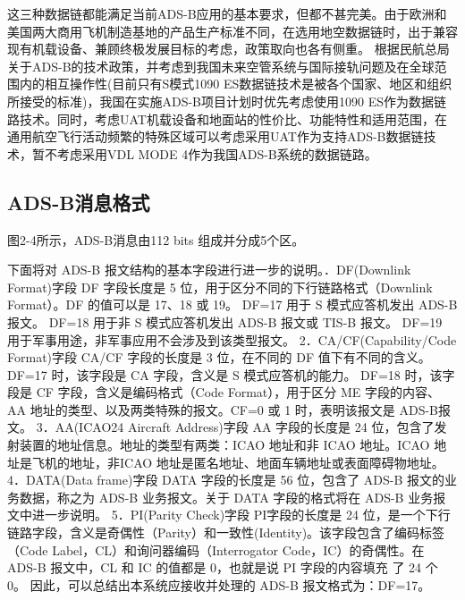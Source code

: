 
这三种数据链都能满足当前ADS-B应用的基本要求，但都不甚完美。由于欧洲和美国两大商用飞机制造基地的产品生产标准不同，在选用地空数据链时，出于兼容现有机载设备、兼顾终极发展目标的考虑，政策取向也各有侧重。 根据民航总局关于ADS-B的技术政策，并考虑到我国未来空管系统与国际接轨问题及在全球范围内的相互操作性(目前只有S模式1090  ES数据链技术是被各个国家、地区和组织所接受的标准)，我国在实施ADS-B项目计划时优先考虑使用1090 ES作为数据链路技术。同时，考虑UAT机载设备和地面站的性价比、功能特性和适用范围，在通用航空飞行活动频繁的特殊区域可以考虑采用UAT作为支持ADS-B数据链技术，暂不考虑采用VDL MODE 4作为我国ADS-B系统的数据链路。


\subsection{ADS-B消息格式}
图2-4所示，ADS-B消息由112 bits 组成并分成5个区。


下面将对 ADS-B 报文结构的基本字段进行进一步的说明。．DF(Downlink Format)字段\newline 
DF 字段长度是 5 位，用于区分不同的下行链路格式（Downlink Format）。DF 的值可以是 17、18 或 19。 
DF=17 用于 S 模式应答机发出 ADS-B 报文。 
DF=18 用于非 S 模式应答机发出 ADS-B 报文或 TIS-B 报文。 
DF=19 用于军事用途，非军事应用不会涉及到该类型报文。 
2．CA/CF(Capability/Code Format)字段\newline 
CA/CF 字段的长度是 3 位，在不同的 DF 值下有不同的含义。 
DF=17 时，该字段是 CA 字段，含义是 S 模式应答机的能力。 
DF=18 时，该字段是 CF 字段，含义是编码格式（Code Format），用于区分 ME 字段的内容、AA 地址的类型、以及两类特殊的报文。CF=0 或 1 时，表明该报文是 ADS-B报文。 
3．AA(ICAO24 Aircraft Address)字段\newline 
AA 字段的长度是 24 位，包含了发射装置的地址信息。地址的类型有两类：ICAO 地址和非 ICAO 地址。ICAO 地址是飞机的地址，非ICAO 地址是匿名地址、地面车辆地址或表面障碍物地址。 
4．DATA(Data frame)字段\newline 
DATA 字段的长度是 56 位，包含了 ADS-B 报文的业务数据，称之为 ADS-B 业务报文。关于 DATA 字段的格式将在 ADS-B 业务报文中进一步说明。 
5．PI(Parity Check)字段\newline 
PI字段的长度是 24 位，是一个下行链路字段，含义是奇偶性（Parity）和一致性(Identity)。该字段包含了编码标签（Code Label，CL）和询问器编码（Interrogator Code，IC）的奇偶性。在 ADS-B 报文中，CL 和 IC 的值都是 0，也就是说 PI 字段的内容填充
了 24 个 0。\newline 
因此，可以总结出本系统应接收并处理的 ADS-B 报文格式为：DF=17。

